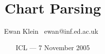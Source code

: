 % 
%
%
%
%
%
%
%
%
%
%
%
%
%
%
%
%
\title{Chart Parsing}
\author{Ewan Klein \newline \mbox{ }ewan@inf.ed.ac.uk\mbox{ }}
\date{ICL --- 7 November 2005}



\newcommand{\Rule}{\rule{\textwidth}{1pt}}
\newcommand{\SqB}[1]{[#1]}

\newcommand{\bigdot}{\mbox{\begin{scriptsize}{\ensuremath{\bullet}}\end{scriptsize}}}

\newcommand{\chdot}{\bigdot}





\usepackage{color}
\usepackage{amsmath}
\usepackage{graphicx}
\usepackage[plain]{algorithm}
% 

\newcommand{\Hilite}[1]{\colorbox{yellow}{#1}}
\newcommand{\Shade}[1]{\colorbox{light}{#1}}

\newcommand{\Em}[1]{\textcolor{red}{#1}}
\newcommand{\Dim}[1]{\textcolor{gray}{#1}}

\setlength{\parskip}{0in}
\setlength{\parindent}{0in}

